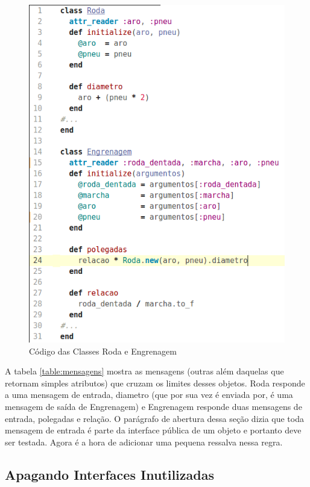 \begin{figure}[!htbp]
  \center
  \includegraphics[scale=0.50]{imagens/codigo_pag_201.png}
  \caption{Código das Classes Roda e Engrenagem}
  \label{img:codigo_pag_201}
\end{figure}

A tabela \ref{table:mensagens} mostra as mensagens (outras além daquelas que retornam simples atributos) que cruzam os limites desses objetos. Roda responde a uma mensagem de entrada, diametro (que por sua vez é enviada por, é uma mensagem de saída de Engrenagem) e Engrenagem responde duas mensagens de entrada, polegadas e relação.
O parágrafo de abertura dessa seção dizia que toda mensagem de entrada é parte da interface pública de um objeto e portanto deve ser testada. Agora é a hora de adicionar uma pequena ressalva nessa regra.

\subsection{Apagando Interfaces Inutilizadas}

